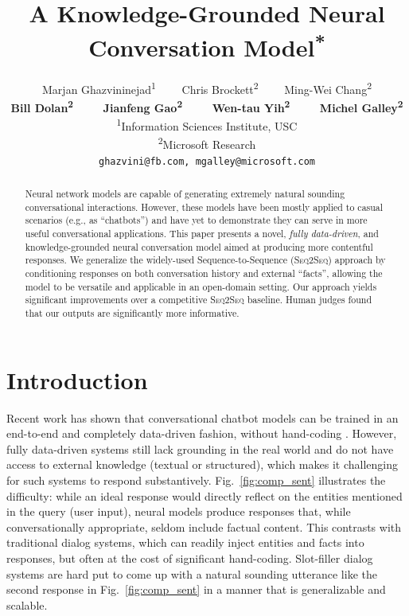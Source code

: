 \documentclass[letterpaper]{article}
\title{A Knowledge-Grounded Neural Conversation Model\textsuperscript{*}}
\author{Marjan Ghazvininejad\textsuperscript{1{\scriptsize \raisebox{1pt}{$\dagger$}}}~~~~
Chris Brockett\textsuperscript{2}~~~~
Ming-Wei Chang\textsuperscript{2{\scriptsize \raisebox{1pt}{$\ddagger$}}}\\
{\bf \Large 
Bill Dolan\textsuperscript{2}~~~~
Jianfeng Gao\textsuperscript{2}~~~~
Wen-tau Yih\textsuperscript{2{\scriptsize \raisebox{1pt}{\S}}}~~~~
Michel Galley\textsuperscript{2}}\\
\textsuperscript{1}Information Sciences Institute, USC\\
\textsuperscript{2}Microsoft Research\\
{\tt ghazvini@fb.com, mgalley@microsoft.com}}
\begin{document}
\maketitle

\newcommand{\bleu}{{{\sc BLEU}}\xspace}
\newcommand{\sts}{{{\textsc{Seq2Seq}}}\xspace}
\newcommand{\MTask}{{{\textsc{MTask}}}\xspace}
\newcommand{\MTaskF}{{{\textsc{MTask-F}}}\xspace}
\newcommand{\MTaskR}{{{\textsc{MTask-R}}}\xspace}
\newcommand{\MTaskRF}{{{\textsc{MTask-RF}}}\xspace}
\newcommand\convs[1]{{\bf {#1}}}
\newcommand\slot[1]{{\it {#1}}}

\begin{abstract}
Neural network models are capable of generating extremely natural
sounding conversational interactions.  However, these models have been
mostly applied to casual scenarios (e.g., as ``chatbots'') and have
yet to demonstrate they can serve in more useful conversational
applications.  This paper presents a novel, {\it fully data-driven},
and knowledge-grounded neural conversation model aimed at producing
more contentful responses.  We generalize the widely-used
Sequence-to-Sequence (\sts) approach by conditioning responses on both
conversation history and external ``facts'', allowing the model to be
versatile and applicable in an open-domain setting.  Our approach
yields significant improvements over a competitive \sts baseline.
Human judges found that our outputs are significantly more
informative.
\end{abstract}

\section{Introduction} 

Recent work has shown that conversational chatbot models can be trained in an end-to-end and completely data-driven fashion, without 
hand-coding \cite[{\it inter alia}]{ritter2011data,sordoni2015,shang2015neural,vinyals2015neural,serban2015hierarchical}.
However, fully data-driven systems still lack grounding in the real world and do not have access to external knowledge (textual or structured), which makes it challenging for such systems to respond substantively.
Fig.~\ref{fig:comp_sent} illustrates the difficulty: while an ideal response would  directly reflect on the entities mentioned in the query (user input), neural models produce responses that, while conversationally appropriate,
seldom include factual content.
This contrasts with traditional dialog systems, which can readily inject entities and facts into responses, but often at the cost of significant hand-coding. 
Slot-filler dialog systems are hard put to come up with a natural sounding utterance like the second response in Fig.~\ref{fig:comp_sent} in a manner that is generalizable and scalable. 
\end{document}
